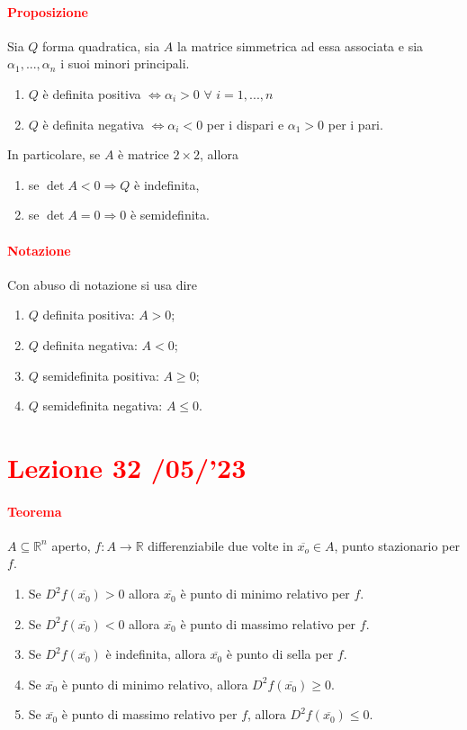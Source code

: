 \documentclass{article}
\newcommand{\R}{\mathbb{R}}
\begin{document}
\paragraph{\textcolor{red}{Proposizione}}
Sia $Q$ forma quadratica, sia $A$ la matrice simmetrica ad essa associata e sia $\alpha_1,...,\alpha_n$ i suoi minori principali.
\begin{enumerate}
    \item $Q$ è definita positiva $\Leftrightarrow \alpha_i >0\,\, \forall \,\, i =1,...,n$
    \item $Q$ è definita negativa $\Leftrightarrow \alpha_i <0 $ per i dispari e $\alpha_1>0$ per i pari. 
\end{enumerate}
In particolare, se $A$ è matrice $2 \times 2$, allora
\begin{enumerate}
    \item se $\det A <0 \Rightarrow Q$ è indefinita,
    \item se $\det A=0 \Rightarrow 0$ è semidefinita.
\end{enumerate}

\paragraph{\textcolor{red}{Notazione}}Con abuso di notazione si usa dire
\begin{enumerate}
    \item $Q$ definita positiva: $A >0$; 
    \item $Q$ definita negativa: $A<0$;
    \item $Q$ semidefinita positiva: $A \geq 0$;
    \item $Q$ semidefinita negativa: $A \leq 0$.
\end{enumerate}

\newpage
\section{\textcolor{red}{Lezione 32 \space{}/05/'23}}

\paragraph{\textcolor{red}{Teorema}}
$A \subseteq \R^n$ aperto, $f:A \rightarrow  \R$ differenziabile due volte in $\overline{x_o}\in A$, punto stazionario per $f$.
\begin{enumerate}
    \item Se $D^2f(\overline{x_0})>0 $ allora $\overline{x_0}$ è punto di minimo relativo per $f$.
    \item Se $D^2f(\overline{x_0})<0$ allora $\overline{x_0}$ è punto di massimo relativo per $f$. 
    \item Se $D^2f(\overline{x_0})$ è indefinita, allora $\overline{x_0}$ è punto di sella per $f$.
    \item Se $\overline{x_0}$ è punto di minimo relativo, allora $D^2f(\overline{x_0})\geq0$.
    \item Se $\overline{x_0}$ è punto di massimo relativo per $f$, allora $D^2f(\overline{x_0})\leq0$.
\end{enumerate}
\end{document}

